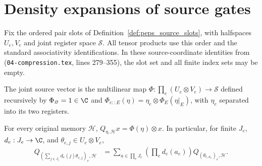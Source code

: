 \section{Density expansions of source gates}
\label{sec:peps_source_gate_density}

Fix the ordered pair slots of Definition~\ref{def:peps_source_slots},
with halfspaces $U_e,V_e$ and joint register space $\mathcal S$. All tensor
products use this order and the standard associativity identifications. In
these source-coordinate identities from
\cite[proof of Theorem~5.2]{OpenAI2026PolynomialPEPS}
(\texttt{04-compression.tex}, lines 279--355),
the slot set and all finite index sets may be empty.


\begin{definition}
    \label{def:peps_joint_source_vector}
    \leanok
    The joint source vector is the multilinear map
    $\Phi:\prod_e(U_e\otimes V_e)\to\mathcal S$ defined recursively
    by $\Phi_{\varnothing}=1\in\C$ and
    $\Phi_{e::E}(\eta)=\eta_e\otimes\Phi_E(\eta|_E)$, with $\eta_e$
    separated into its two registers.
\end{definition}

\begin{lemma}
    \label{thm:peps_source_preparation_sums}
    \leanok
    For every original memory $\mathcal H$,
    $Q_{\eta,\mathcal H}x=\Phi(\eta)\otimes x$.
    In particular, for finite $J_e$, $d_e:J_e\to\C$, and
    $\theta_{e,j}\in U_e\otimes V_e$,
    \begin{align}
        Q_{(\sum_{j\in J_e}d_e(j)\theta_{e,j})_e,\mathcal H}
         & =\sum_{a\in\prod_e J_e}
        \left(\prod_e d_e(a_e)\right)
        Q_{(\theta_{e,a_e})_e,\mathcal H}.
        \label{eq:peps_source_preparation_sum}
    \end{align}
\end{lemma}

